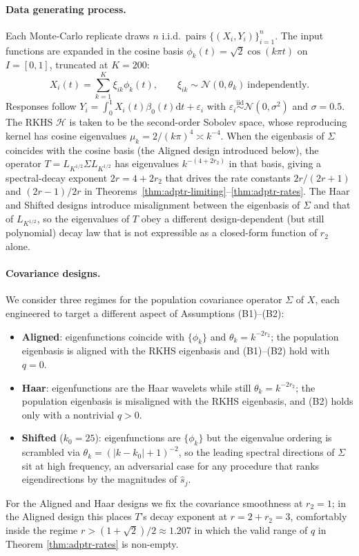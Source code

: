 \documentclass[11pt,a4paper]{article}
\renewcommand{\hat}{\widehat}
\theoremstyle{definition}
\theoremstyle{plain}
\theoremstyle{remark}
\newcommand{\ud}{\mathrm d}
\newcommand{\mH}{\mathcal H}
\begin{document}
\paragraph{Data generating process.}
Each Monte-Carlo replicate draws $n$ i.i.d.\ pairs $\{(X_i,Y_i)\}_{i=1}^n$. The input functions are expanded in the cosine basis $\phi_k(t)=\sqrt{2}\cos(k\pi t)$ on $I=[0,1]$, truncated at $K=200$:
\[
X_i(t)=\sum_{k=1}^{K}\xi_{ik}\phi_k(t),\qquad \xi_{ik}\sim\mathcal N(0,\theta_k)\ \text{independently}.
\]
Responses follow $Y_i=\int_0^1 X_i(t)\beta_0(t)\ud t+\varepsilon_i$ with $\varepsilon_i\stackrel{\text{iid}}{\sim}\mathcal N(0,\sigma^2)$ and $\sigma=0.5$. The RKHS $\mH$ is taken to be the second-order Sobolev space, whose reproducing kernel has cosine eigenvalues $\mu_k=2/(k\pi)^4\asymp k^{-4}$. When the eigenbasis of $\Sigma$ coincides with the cosine basis (the Aligned design introduced below), the operator $T=L_{K^{1/2}}\Sigma L_{K^{1/2}}$ has eigenvalues $k^{-(4+2r_2)}$ in that basis, giving a spectral-decay exponent $2r=4+2r_2$ that drives the rate constants $2r/(2r+1)$ and $(2r-1)/2r$ in Theorems~\ref{thm:adptr-limiting}--\ref{thm:adptr-rates}. The Haar and Shifted designs introduce misalignment between the eigenbasis of $\Sigma$ and that of $L_{K^{1/2}}$, so the eigenvalues of $T$ obey a different design-dependent (but still polynomial) decay law that is not expressible as a closed-form function of $r_2$ alone.

\paragraph{Covariance designs.}
We consider three regimes for the population covariance operator $\Sigma$ of $X$, each engineered to target a different aspect of Assumptions (B1)--(B2):
\begin{itemize}
\item \textbf{Aligned}: eigenfunctions coincide with $\{\phi_k\}$ and $\theta_k=k^{-2r_2}$; the population eigenbasis is aligned with the RKHS eigenbasis and (B1)--(B2) hold with $q=0$.
\item \textbf{Haar}: eigenfunctions are the Haar wavelets while still $\theta_k=k^{-2r_2}$; the population eigenbasis is misaligned with the RKHS eigenbasis, and (B2) holds only with a nontrivial $q>0$.
\item \textbf{Shifted} ($k_0=25$): eigenfunctions are $\{\phi_k\}$ but the eigenvalue ordering is scrambled via $\theta_k=(|k-k_0|+1)^{-2}$, so the leading spectral directions of $\Sigma$ sit at high frequency, an adversarial case for any procedure that ranks eigendirections by the magnitudes of $\hat s_j$.
\end{itemize}
For the Aligned and Haar designs we fix the covariance smoothness at $r_2=1$; in the Aligned design this places $T$'s decay exponent at $r=2+r_2=3$, comfortably inside the regime $r>(1+\sqrt 2)/2\approx 1.207$ in which the valid range of $q$ in Theorem \ref{thm:adptr-rates} is non-empty.
\end{document}
